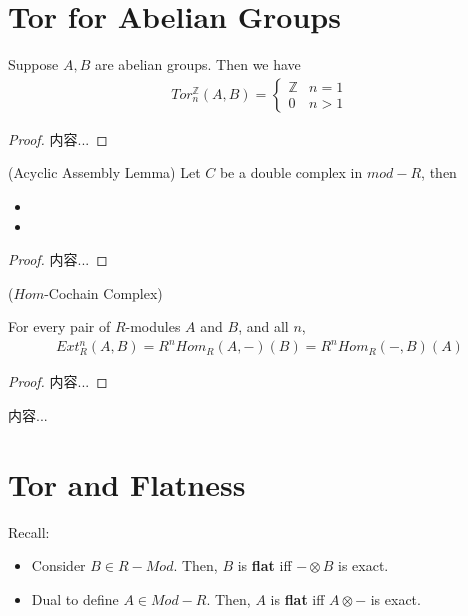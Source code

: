 \documentclass[Total.tex]{subfiles}
\begin{document}
		\section{Tor for Abelian Groups}
			\begin{proposition}
				Suppose $A,B$ are abelian groups. Then we have
				\begin{gather*}
					Tor_n^\mathbb{Z}(A,B)=\begin{cases}
						\mathbb{Z}&n=1\\
						0&n>1
					\end{cases}
				\end{gather*}
			\end{proposition}
			\begin{proof}
				内容...
			\end{proof}
			
			\begin{theorem}
				(Acyclic Assembly Lemma) Let $C$ be a double complex in $mod-R$, then 
				\begin{itemize}
					\item 
					\item 
				\end{itemize}
			\end{theorem}
			\begin{proof}
				内容...
			\end{proof}
			
			\begin{Def}
				($Hom$-Cochain Complex)
			\end{Def}
			
			\begin{theorem}
				For every pair of $R$-modules $A$ and $B$, and all $n$,
				\begin{gather*}
					Ext_R^n(A,B)=R^nHom_R(A,-)(B)=R^nHom_R(-,B)(A)
				\end{gather*}
			\end{theorem}
			\begin{proof}
				内容...
			\end{proof}
			
			\begin{Def}
				内容...
			\end{Def}
		\section{Tor and Flatness}
			\begin{Def}
				Recall:
				\begin{itemize}
					\item 
					Consider $B\in R-Mod$. Then, $B$ is \textbf{flat} iff $-\otimes B$ is exact.
					
					\item Dual to define $A\in Mod-R$. Then, $A$ is \textbf{flat} iff $A\otimes -$ is exact.
				\end{itemize}
			\end{Def}
\end{document}
